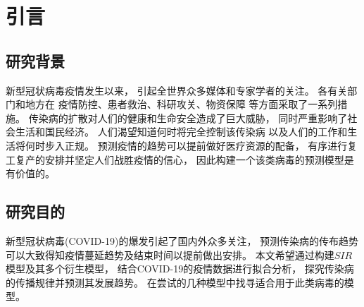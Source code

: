 \section{引言}
\subsection{研究背景}
新型冠状病毒疫情发生以来，
引起全世界众多媒体和专家学者的关注。
各有关部门和地方在
疫情防控、患者救治、科研攻关、物资保障
等方面采取了一系列措施。
传染病的扩散对人们的健康和生命安全造成了巨大威胁，
同时严重影响了社会生活和国民经济。
人们渴望知道何时将完全控制该传染病
以及人们的工作和生活将何时步入正规。
预测疫情的趋势可以提前做好医疗资源的配备，
有序进行复工复产的安排并坚定人们战胜疫情的信心，
因此构建一个该类病毒的预测模型是有价值的。
\subsection{研究目的}
新型冠状病毒(COVID-19)的爆发引起了国内外众多关注，
预测传染病的传布趋势可以大致得知疫情蔓延趋势及结束时间以提前做出安排。
本文希望通过构建$SIR$模型及其多个衍生模型，
结合COVID-19的疫情数据进行拟合分析，
探究传染病的传播规律并预测其发展趋势。
在尝试的几种模型中找寻适合用于此类病毒的模型。